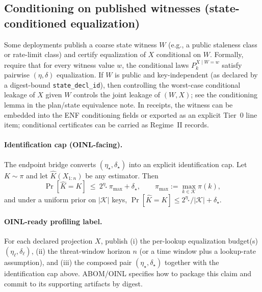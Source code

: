 \documentclass[11pt]{article}
\begin{document}
\subsection{Conditioning on published witnesses (state-conditioned equalization)}
Some deployments publish a coarse state witness $W$ (e.g., a public staleness class or rate-limit class) and certify equalization of $X$ conditional on $W$.
Formally, require that for every witness value $w$, the conditional laws $P_k^{X\mid W=w}$ satisfy pairwise $(\eta,\delta)$ equalization.
If $W$ is public and key-independent (as declared by a digest-bound \texttt{state\_decl\_id}), then controlling the worst-case conditional leakage of $X$ given $W$ controls the joint leakage of $(W,X)$; see the conditioning lemma in the plan/state equivalence note.\cite{series:planstateequiv}
In receipts, the witness can be embedded into the ENF conditioning fields or exported as an explicit Tier~0 line item; conditional certificates can be carried as Regime~II records.\cite{series:condcert}

\paragraph{Identification cap (OINL-facing).}
The endpoint bridge converts $(\eta_\star,\delta_\star)$ into an explicit identification cap.\cite{series:endpointbridge}
Let $K\sim\pi$ and let $\widehat K(X_{1:n})$ be any estimator. Then
\[
\Pr[\widehat K = K]\ \le\ 2^{\eta_\star}\,\pi_{\max} + \delta_\star,
\qquad\pi_{\max}:=\max_{k\in\mathcal K}\pi(k),
\]
and under a uniform prior on $|\mathcal K|$ keys, $\Pr[\widehat K = K]\le 2^{\eta_\star}/|\mathcal K| + \delta_\star$.

\paragraph{OINL-ready profiling label.}
For each declared projection $X$, publish (i) the per-lookup equalization budget(s) $(\eta_\ell,\delta_\ell)$, (ii) the threat-window horizon $n$ (or a time window plus a lookup-rate assumption), and (iii) the composed pair $(\eta_\star,\delta_\star)$ together with the identification cap above.
ABOM/OINL specifies how to package this claim and commit to its supporting artifacts by digest.\cite{series:abomoinl}
\end{document}
